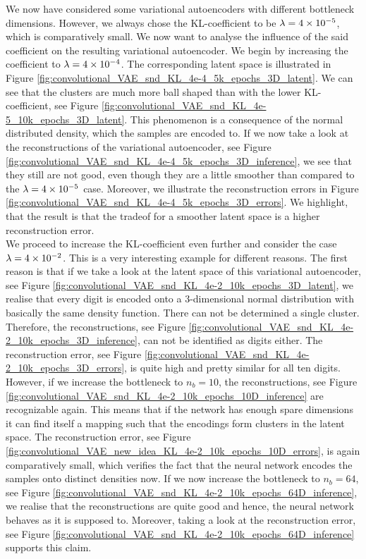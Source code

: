 We now have considered some variational autoencoders with different bottleneck dimensions. However, we always chose the KL-coefficient to be $\lambda = \num{4e-5}$, which is comparatively small. We now want to analyse the influence of the said coefficient on the resulting variational autoencoder. We begin by increasing the coefficient to $\lambda = \num{4e-4}$. The corresponding latent space is illustrated in Figure \ref{fig:convolutional_VAE_snd_KL_4e-4_5k_epochs_3D_latent}. We can see that the clusters are much more ball shaped than with the lower KL-coefficient, see Figure \ref{fig:convolutional_VAE_snd_KL_4e-5_10k_epochs_3D_latent}. This phenomenon is a consequence of the normal distributed density, which the samples are encoded to. If we now take a look at the reconstructions of the variational autoencoder, see Figure \ref{fig:convolutional_VAE_snd_KL_4e-4_5k_epochs_3D_inference}, we see that they still are not good, even though they are a little smoother than compared to the $\lambda = \num{4e-5}$ case.
Moreover, we illustrate the reconstruction errors in Figure \ref{fig:convolutional_VAE_snd_KL_4e-4_5k_epochs_3D_errors}. We highlight, that the result is that the tradeof for a smoother latent space is a higher reconstruction error.\\
We proceed to increase the KL-coefficient even further and consider the case $\lambda = \num{4e-2}$. This is a very interesting example for different reasons. The first reason is that if we take a look at the latent space of this variational autoencoder, see Figure \ref{fig:convolutional_VAE_snd_KL_4e-2_10k_epochs_3D_latent}, we realise that every digit is encoded onto a $3$-dimensional normal distribution with basically the same density function. There can not be determined a single cluster. Therefore, the reconstructions, see Figure \ref{fig:convolutional_VAE_snd_KL_4e-2_10k_epochs_3D_inference}, can not be identified as digits either. The reconstruction error, see Figure \ref{fig:convolutional_VAE_snd_KL_4e-2_10k_epochs_3D_errors}, is quite high and pretty similar for all ten digits. However, if we increase the bottleneck to $n_b=10$, the reconstructions, see Figure \ref{fig:convolutional_VAE_snd_KL_4e-2_10k_epochs_10D_inference} are recognizable again. This means that if the network has enough \glqq spare dimensions\grqq{} it can find itself a mapping such that the encodings form clusters in the latent space. The reconstruction error, see Figure \ref{fig:convolutional_VAE_new_idea_KL_4e-2_10k_epochs_10D_errors}, is again comparatively small, which verifies the fact that the neural network encodes the samples onto distinct densities now. If we now increase the bottleneck to $n_b=64$, see Figure \ref{fig:convolutional_VAE_snd_KL_4e-2_10k_epochs_64D_inference}, we realise that the reconstructions are quite good and hence, the neural network behaves as it is supposed to. Moreover, taking a look at the reconstruction error, see Figure \ref{fig:convolutional_VAE_snd_KL_4e-2_10k_epochs_64D_inference} supports this claim.\\
